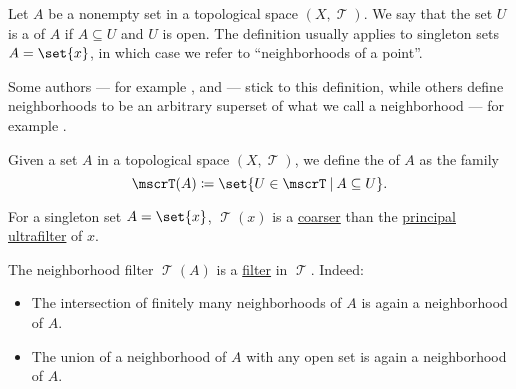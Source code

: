 \begin{definition}\label{def:topological_neighborhood}
  Let \( A \) be a nonempty set in a topological space \( (X, \mscrT) \). We say that the set \( U \) is a  of \( A \) if \( A \subseteq U \) and \( U \) is open. The definition usually applies to singleton sets \( A = \set{ x } \), in which case we refer to \enquote{neighborhoods of a point}.
\end{definition}
\begin{comments}
  \item Some authors --- for example ,  and  --- stick to this definition, while others define neighborhoods to be an arbitrary superset of what we call a neighborhood --- for example .
\end{comments}

\begin{definition}\label{def:neighborhood_filter}
  Given a set \( A \) in a topological space \( (X, \mscrT) \), we define the  of \( A \) as the family
  \begin{equation*}
    \mscrT(A) \coloneqq \set{ U \in \mscrT \given A \subseteq U }.
  \end{equation*}
\end{definition}
\begin{comments}
  \item For a singleton set \( A = \set{ x } \), \( \mscrT(x) \) is a \hyperref[def:filter_ordering]{coarser} than the \hyperref[def:principal_ultrafilter]{principal ultrafilter} of \( x \).
\end{comments}
\begin{defproof}
  The neighborhood filter \( \mscrT(A) \) is a \hyperref[def:lattice_ideal]{filter} in \( \mscrT \). Indeed:
  \begin{itemize}
    \item The intersection of finitely many neighborhoods of \( A \) is again a neighborhood of \( A \).
    \item The union of a neighborhood of \( A \) with any open set is again a neighborhood of \( A \).
  \end{itemize}
\end{defproof}

